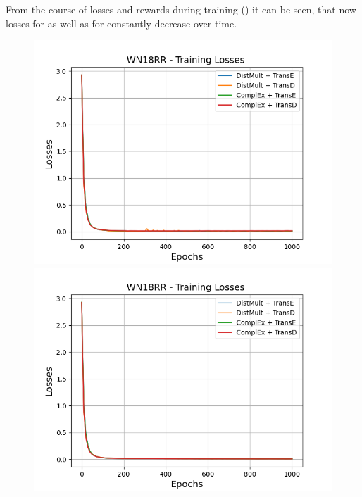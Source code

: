 From the course of losses and rewards during training () it can be seen, that now losses for \usmax as well as for \ussoftmax constantly decrease over time.
\begin{figure}[H]
    \centering
    \begin{minipage}{.5\textwidth}
      \centering
      \includegraphics[width=0.9\linewidth]{figures/results/gan_train/not_pretrained/uncertainty/max/entropy/wn18rr/1k_epochs/uncertainty_wn18rr_losses.png}
    \end{minipage}%
    \begin{minipage}{.5\textwidth}
      \centering
      \includegraphics[width=0.9\linewidth]{figures/results/gan_train/not_pretrained/uncertainty/max_distribution/entropy/wn18rr/1k_epochs/uncertainty_wn18rr_losses.png}
    \end{minipage}

\end{figure}
